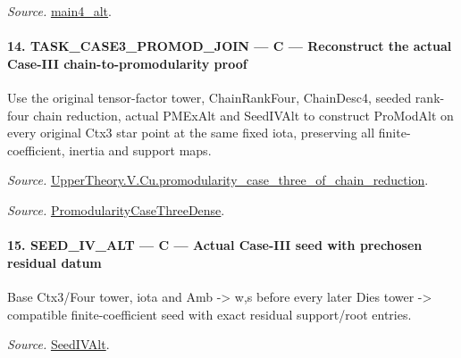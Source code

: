 \emph{Source.} \href{https://github.com/CocoSgt/riemann-hypothesis-lean/blob/7cbf7a0c32fca1badf05931879a37c3f8a2b03b4/src/Development/AutomorphicArithmetic/AutomorphicVarieties/ModularityArgument/ThresholdArguments/DenseThresholdCases/CuFinal.lean#L44-L44}{main4\_\allowbreak alt}.



\paragraph{14. TASK\_\allowbreak CASE3\_\allowbreak PROMOD\_\allowbreak JOIN — C — Reconstruct the actual Case-III chain-to-promodularity proof}

Use the original tensor-factor tower, ChainRankFour, ChainDesc4, seeded rank-four chain reduction, actual PMExAlt and SeedIVAlt to construct ProModAlt on every original Ctx3 star point at the same fixed iota, preserving all finite-coefficient, inertia and support maps.

\emph{Source.} \href{https://github.com/CocoSgt/riemann-hypothesis-lean/blob/7cbf7a0c32fca1badf05931879a37c3f8a2b03b4/src/Development/AutomorphicArithmetic/AutomorphicVarieties/ModularityArgument/ThresholdArguments/DenseThresholdCases/PromodularityCaseThreeOfLemmas.lean#L131-L153}{UpperTheory.V.Cu.promodularity\_\allowbreak case\_\allowbreak three\_\allowbreak of\_\allowbreak chain\_\allowbreak reduction}.

\emph{Source.} \href{https://github.com/CocoSgt/riemann-hypothesis-lean/blob/7cbf7a0c32fca1badf05931879a37c3f8a2b03b4/src/Development/AutomorphicArithmetic/AutomorphicVarieties/ModularityArgument/ThresholdArguments/DenseThresholdCases/PromodularityCaseThree.lean#L40-L42}{PromodularityCaseThreeDense}.



\paragraph{15. SEED\_\allowbreak IV\_\allowbreak ALT — C — Actual Case-III seed with prechosen residual datum}

Base Ctx3/Four tower, iota and Amb -> w,s before every later Dies tower -> compatible finite-coefficient seed with exact residual support/root entries.

\emph{Source.} \href{https://github.com/CocoSgt/riemann-hypothesis-lean/blob/7cbf7a0c32fca1badf05931879a37c3f8a2b03b4/src/Development/AutomorphicArithmetic/AutomorphicVarieties/ModularityArgument/ThresholdArguments/DenseThresholdCases/PromodularityCaseThree.lean#L19-L25}{SeedIVAlt}.



